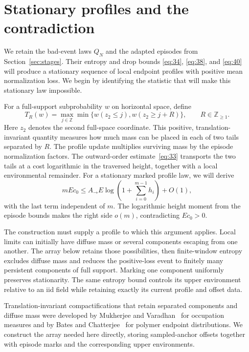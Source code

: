 \section{Stationary profiles and the contradiction}\label{sec:stationary}

We retain the bad-event laws \(Q_N\) and the adapted episodes from
Section~\ref{sec:stages}. Their entropy and drop bounds
\eqref{eq:34}, \eqref{eq:38}, and \eqref{eq:40} will produce a stationary
sequence of local endpoint profiles with positive mean normalization
loss. We begin by identifying the statistic that will make this
stationary law impossible.

For a full-support subprobability \(w\) on horizontal space, define
\[
 T_R(w)=\max_{j\in\mathbb Z}
       \min\{w(z_2\le j),w(z_2\ge j+R)\},\qquad R\in\mathbb Z_{\ge1}.
\]
Here \(z_2\) denotes the second full-space coordinate. This positive,
translation-invariant quantity measures how much mass can be placed in
each of two tails separated by \(R\). The profile update multiplies
surviving mass by the episode normalization factors. The outward-order
estimate~\eqref{eq:33} transports the two tails at a cost logarithmic
in the traversed height, together with a local environmental remainder.
For a stationary marked profile law, we will derive
\[
 mE c_0\le A_\to E\log\left(1+\sum_{i=0}^{m-1}h_i\right)+O(1),
\]
with the last term independent of \(m\). The logarithmic height moment
from the episode bounds makes the right side \(o(m)\), contradicting
\(E c_0>0\).

The construction must supply a profile to which this argument applies.
Local limits can initially have diffuse mass or several components
escaping from one another. The array below retains those possibilities,
then finite-window entropy excludes diffuse mass and reduces the
positive-loss event to finitely many persistent components of full
support. Marking one component uniformly preserves stationarity. The
same entropy bound controls its upper environment relative to an iid
field while retaining exactly its current profile and offset data.

Translation-invariant compactifications that retain separated components
and diffuse mass were developed by Mukherjee and
Varadhan~\cite[Theorem~3.2]{MukherjeeVaradhan2016} for occupation measures
and by Bates and Chatterjee~\cite[Theorem~2.8]{BatesChatterjee2020} for
polymer endpoint distributions. We construct the array needed here
directly, storing sampled-anchor offsets together with episode marks
and the corresponding upper environments.

